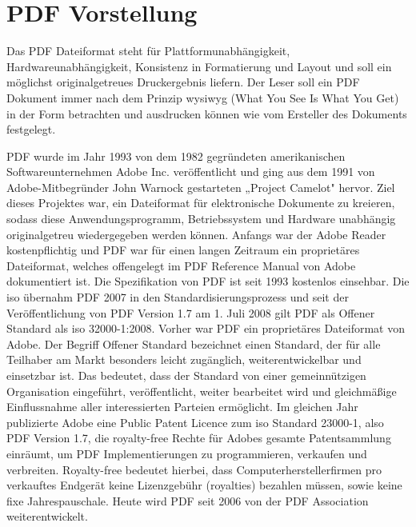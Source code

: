 \section{PDF Vorstellung}
Das PDF Dateiformat steht für Plattformunabhängigkeit, Hardwareunabhängigkeit, Konsistenz in Formatierung und Layout und soll ein möglichst originalgetreues Druckergebnis liefern. Der Leser soll ein PDF Dokument immer nach dem Prinzip \gls{wysiwyg} (What You See Is What You Get) in der Form betrachten und ausdrucken können wie vom Ersteller des Dokuments festgelegt.
\par
PDF wurde im Jahr 1993 von dem 1982 gegründeten amerikanischen Softwareunternehmen Adobe Inc. veröffentlicht und ging aus dem 1991 von Adobe-Mitbegründer John Warnock gestarteten „Project Camelot" hervor. \cite{wiki-adobe, wiki-pdf-de} Ziel dieses Projektes war, ein Dateiformat für elektronische Dokumente zu kreieren, sodass diese Anwendungsprogramm, Betriebssystem und Hardware unabhängig originalgetreu wiedergegeben werden können. Anfangs war der Adobe Reader kostenpflichtig und PDF war für einen langen Zeitraum ein proprietäres Dateiformat, welches offengelegt im PDF Reference Manual von Adobe dokumentiert ist. Die Spezifikation von PDF ist seit 1993 kostenlos einsehbar. \cite{wiki-pdf-engl} Die \gls{iso} übernahm PDF 2007 in den Standardisierungsprozess und seit der Veröffentlichung von PDF Version 1.7 am 1. Juli 2008 gilt PDF als Offener Standard als \gls{iso} 32000-1:2008. \cite{wiki-pdf-de, wiki-pdf-engl} Vorher war PDF ein proprietäres Dateiformat von Adobe. Der Begriff Offener Standard bezeichnet einen Standard, der für alle Teilhaber am Markt besonders leicht zugänglich, weiterentwickelbar und einsetzbar ist. Das bedeutet, dass der Standard von einer gemeinnützigen Organisation eingeführt, veröffentlicht, weiter bearbeitet wird und gleichmäßige Einflussnahme aller interessierten Parteien ermöglicht. \cite{wiki-standard} Im gleichen Jahr publizierte Adobe eine Public Patent Licence zum \gls{iso} Standard 23000-1, also PDF Version 1.7, die royalty-free Rechte für Adobes gesamte Patentsammlung einräumt, um PDF Implementierungen zu programmieren, verkaufen und verbreiten. \cite{wiki-pdf-engl} Royalty-free bedeutet hierbei, dass Computerherstellerfirmen pro verkauftes Endgerät keine Lizenzgebühr (royalties) bezahlen müssen, sowie keine fixe Jahrespauschale. \cite{wiki-roy-free} Heute wird PDF seit 2006 von der PDF Association weiterentwickelt. \cite{wiki-pdf-de}
